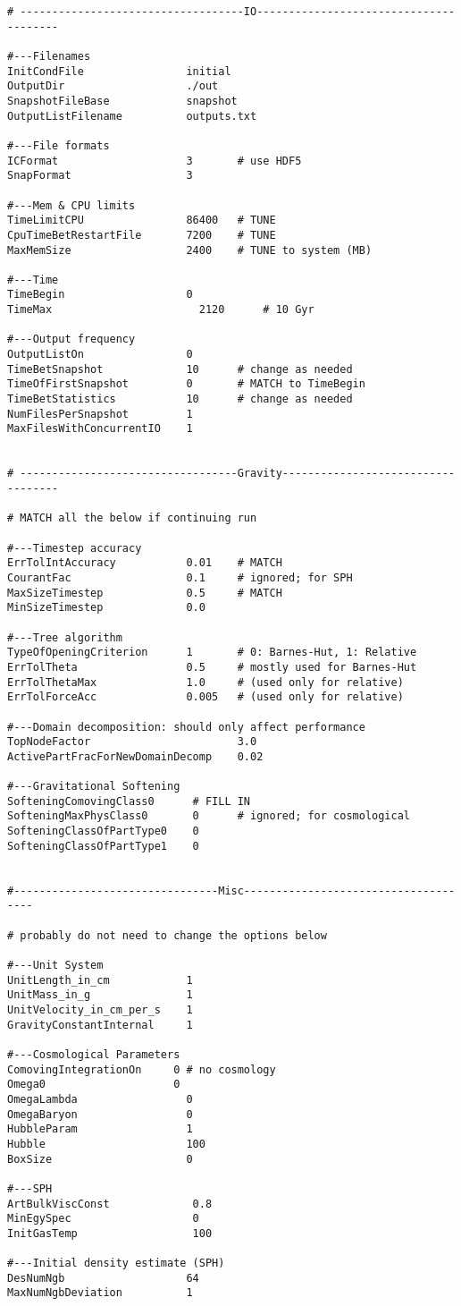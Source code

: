 \begin{verbatim}
# -----------------------------------IO---------------------------------------

#---Filenames
InitCondFile                initial
OutputDir                   ./out
SnapshotFileBase            snapshot
OutputListFilename          outputs.txt

#---File formats 
ICFormat                    3       # use HDF5
SnapFormat                  3 

#---Mem & CPU limits
TimeLimitCPU                86400   # TUNE
CpuTimeBetRestartFile       7200    # TUNE 
MaxMemSize                  2400    # TUNE to system (MB)

#---Time
TimeBegin                   0
TimeMax                       2120      # 10 Gyr

#---Output frequency
OutputListOn                0
TimeBetSnapshot             10      # change as needed
TimeOfFirstSnapshot         0       # MATCH to TimeBegin
TimeBetStatistics           10      # change as needed 
NumFilesPerSnapshot         1
MaxFilesWithConcurrentIO    1 


# ----------------------------------Gravity-----------------------------------

# MATCH all the below if continuing run

#---Timestep accuracy
ErrTolIntAccuracy           0.01    # MATCH
CourantFac                  0.1     # ignored; for SPH
MaxSizeTimestep             0.5     # MATCH
MinSizeTimestep             0.0 

#---Tree algorithm
TypeOfOpeningCriterion      1       # 0: Barnes-Hut, 1: Relative
ErrTolTheta                 0.5     # mostly used for Barnes-Hut
ErrTolThetaMax              1.0     # (used only for relative)
ErrTolForceAcc              0.005   # (used only for relative)

#---Domain decomposition: should only affect performance
TopNodeFactor                       3.0
ActivePartFracForNewDomainDecomp    0.02

#---Gravitational Softening
SofteningComovingClass0      # FILL IN
SofteningMaxPhysClass0       0      # ignored; for cosmological
SofteningClassOfPartType0    0
SofteningClassOfPartType1    0


#--------------------------------Misc-------------------------------------

# probably do not need to change the options below 

#---Unit System
UnitLength_in_cm            1 
UnitMass_in_g               1
UnitVelocity_in_cm_per_s    1 
GravityConstantInternal     1

#---Cosmological Parameters 
ComovingIntegrationOn     0 # no cosmology
Omega0                    0
OmegaLambda                 0 
OmegaBaryon                 0
HubbleParam                 1
Hubble                      100
BoxSize                     0

#---SPH
ArtBulkViscConst             0.8
MinEgySpec                   0
InitGasTemp                  100

#---Initial density estimate (SPH)
DesNumNgb                   64
MaxNumNgbDeviation          1
\end{verbatim}
